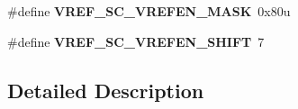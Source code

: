 \begin{DoxyCompactItemize}
\item 
\#define {\bfseries V\+R\+E\+F\+\_\+\+S\+C\+\_\+\+V\+R\+E\+F\+E\+N\+\_\+\+M\+A\+SK}~0x80u\hypertarget{group__VREF__Register__Masks_ga2df8186aa60a77e25e67589bc50ce539}{}\label{group__VREF__Register__Masks_ga2df8186aa60a77e25e67589bc50ce539}

\item 
\#define {\bfseries V\+R\+E\+F\+\_\+\+S\+C\+\_\+\+V\+R\+E\+F\+E\+N\+\_\+\+S\+H\+I\+FT}~7\hypertarget{group__VREF__Register__Masks_gaca5e397ea8b43f55854f4a6b80ec479b}{}\label{group__VREF__Register__Masks_gaca5e397ea8b43f55854f4a6b80ec479b}

\end{DoxyCompactItemize}


\subsection{Detailed Description}
